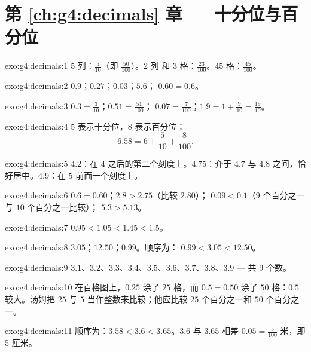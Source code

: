 \section*{第 \ref{ch:g4:decimals} 章 --- 十分位与百分位}

\begin{solution}{exo:g4:decimals:1}
$5$ 列：$\frac{5}{10}$（即 $\frac{50}{100}$）。$2$ 列
和 $3$ 格：$\frac{23}{100}$。$45$ 格：$\frac{45}{100}$。
\end{solution}

\begin{solution}{exo:g4:decimals:2}
$0.9$；\quad $0.27$；\quad $0.03$；\quad $5.6$；\quad
$0.60 = 0.6$。
\end{solution}

\begin{solution}{exo:g4:decimals:3}
$0.3 = \frac{3}{10}$；\quad $0.51 = \frac{51}{100}$；\quad
$0.07 = \frac{7}{100}$；\quad $1.9 = 1 + \frac{9}{10} =
\frac{19}{10}$。
\end{solution}

\begin{solution}{exo:g4:decimals:4}
$5$ 表示十分位，$8$ 表示百分位：
\[
6.58 = 6 + \frac{5}{10} + \frac{8}{100}.
\]
\end{solution}

\begin{solution}{exo:g4:decimals:5}
$4.2$：在 $4$ 之后的第二个刻度上。$4.75$：介于
$4.7$ 与 $4.8$ 之间，恰好居中。$4.9$：在 $5$ 前面一个刻度上。
\end{solution}

\begin{solution}{exo:g4:decimals:6}
$0.6 = 0.60$；\quad $2.8 > 2.75$（比较 $2.80$）；\quad
$0.09 < 0.1$（$9$ 个百分之一与 $10$ 个百分之一比较）；\quad
$5.3 > 5.13$。
\end{solution}

\begin{solution}{exo:g4:decimals:7}
$0.95 < 1.05 < 1.45 < 1.5$。
\end{solution}

\begin{solution}{exo:g4:decimals:8}
$3.05$；\quad $12.50$；\quad $0.99$。顺序为：
$0.99 < 3.05 < 12.50$。
\end{solution}

\begin{solution}{exo:g4:decimals:9}
$3.1$、$3.2$、$3.3$、$3.4$、$3.5$、$3.6$、$3.7$、$3.8$、$3.9$ ---
共 9 个数。
\end{solution}

\begin{solution}{exo:g4:decimals:10}
在百格图上，$0.25$ 涂了 $25$ 格，而 $0.5 = 0.50$
涂了 $50$ 格：$0.5$ 较大。汤姆把 $25$ 与
$5$ 当作整数来比较；他应比较 $25$ 个百分之一和 $50$ 个百分之一。
\end{solution}

\begin{solution}{exo:g4:decimals:11}
顺序为：$3.58 < 3.6 < 3.65$。$3.6$ 与 $3.65$ 相差
$0.05 = \frac{5}{100}$ 米，即 5 厘米。
\end{solution}
